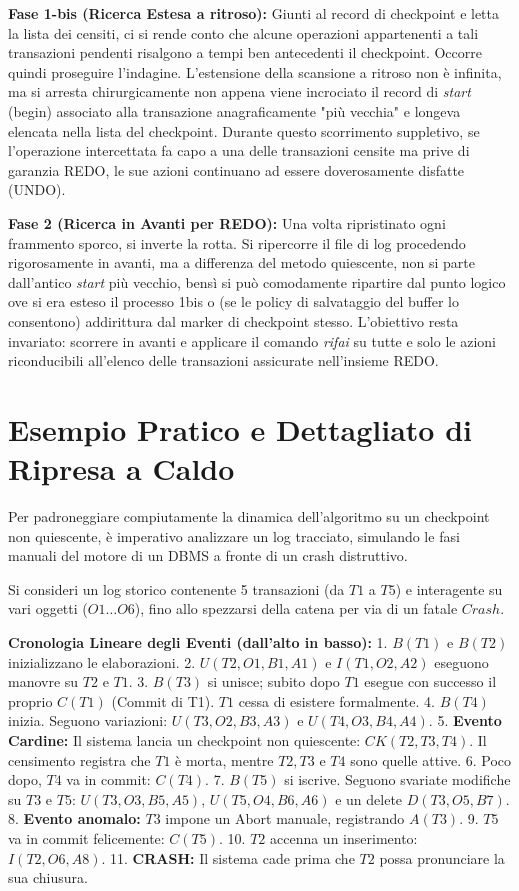\textbf{Fase 1-bis (Ricerca Estesa a ritroso):}
Giunti al record di checkpoint e letta la lista dei censiti, ci si rende conto che alcune operazioni appartenenti a tali transazioni pendenti risalgono a tempi ben antecedenti il checkpoint. Occorre quindi proseguire l'indagine. L'estensione della scansione a ritroso non è infinita, ma si arresta chirurgicamente non appena viene incrociato il record di \textit{start} (begin) associato alla transazione anagraficamente "più vecchia" e longeva elencata nella lista del checkpoint. Durante questo scorrimento suppletivo, se l'operazione intercettata fa capo a una delle transazioni censite ma prive di garanzia REDO, le sue azioni continuano ad essere doverosamente disfatte (UNDO).

\textbf{Fase 2 (Ricerca in Avanti per REDO):}
Una volta ripristinato ogni frammento sporco, si inverte la rotta. Si ripercorre il file di log procedendo rigorosamente in avanti, ma a differenza del metodo quiescente, non si parte dall'antico \textit{start} più vecchio, bensì si può comodamente ripartire dal punto logico ove si era esteso il processo 1bis o (se le policy di salvataggio del buffer lo consentono) addirittura dal marker di checkpoint stesso. L'obiettivo resta invariato: scorrere in avanti e applicare il comando \textit{rifai} su tutte e solo le azioni riconducibili all'elenco delle transazioni assicurate nell'insieme REDO.

\section{Esempio Pratico e Dettagliato di Ripresa a Caldo}

Per padroneggiare compiutamente la dinamica dell'algoritmo su un checkpoint non quiescente, è imperativo analizzare un log tracciato, simulando le fasi manuali del motore di un DBMS a fronte di un crash distruttivo.

Si consideri un log storico contenente 5 transazioni (da $T1$ a $T5$) e interagente su vari oggetti ($O1 \dots O6$), fino allo spezzarsi della catena per via di un fatale $Crash$.

\textbf{Cronologia Lineare degli Eventi (dall'alto in basso):}
1. $B(T1)$ e $B(T2)$ inizializzano le elaborazioni.
2. $U(T2, O1, B1, A1)$ e $I(T1, O2, A2)$ eseguono manovre su $T2$ e $T1$.
3. $B(T3)$ si unisce; subito dopo $T1$ esegue con successo il proprio $C(T1)$ (Commit di T1). $T1$ cessa di esistere formalmente.
4. $B(T4)$ inizia. Seguono variazioni: $U(T3, O2, B3, A3)$ e $U(T4, O3, B4, A4)$.
5. \textbf{Evento Cardine:} Il sistema lancia un checkpoint non quiescente: \textbf{$CK(T2, T3, T4)$}. Il censimento registra che $T1$ è morta, mentre $T2, T3$ e $T4$ sono quelle attive.
6. Poco dopo, $T4$ va in commit: $C(T4)$.
7. $B(T5)$ si iscrive. Seguono svariate modifiche su $T3$ e $T5$: $U(T3, O3, B5, A5)$, $U(T5, O4, B6, A6)$ e un delete $D(T3, O5, B7)$.
8. \textbf{Evento anomalo:} $T3$ impone un Abort manuale, registrando $A(T3)$.
9. $T5$ va in commit felicemente: $C(T5)$.
10. $T2$ accenna un inserimento: $I(T2, O6, A8)$.
11. \textbf{CRASH:} Il sistema cade prima che $T2$ possa pronunciare la sua chiusura.

